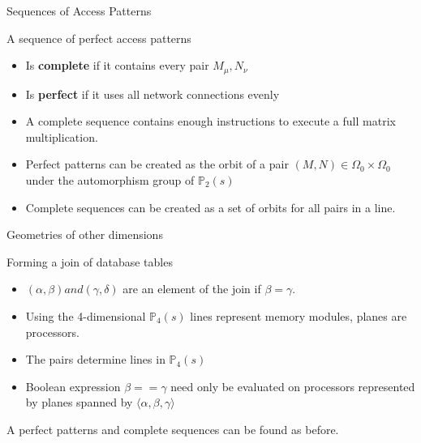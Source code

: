 \documentclass{beamer}
\begin{document}
\begin{frame}{Sequences of Access Patterns}

\begin{block}{A sequence of perfect access patterns}
\begin{itemize}
\item Is {\bf complete} if it contains every pair $M_\mu, N_\nu$
\item Is {\bf perfect} if it uses all network connections evenly
\end{itemize}
\end{block}

\begin{itemize}
\item A complete sequence contains enough instructions to execute a full matrix multiplication.
\item Perfect patterns can be created as the orbit of a pair $(M,N) \in \Omega_0 \times \Omega_0$ under the automorphism group of $\mathbb{P}_2(s)$
\item Complete sequences can be created as a set of orbits for all pairs in a line.
\end{itemize}

\end{frame}

\begin{frame}{Geometries of other dimensions}

\begin{block}{Forming a join of database tables}
\begin{itemize}
\item $(\alpha, \beta) and (\gamma, \delta)$ are an element of the join if $\beta = \gamma$.
\item Using the 4-dimensional $\mathbb{P}_4(s)$ lines represent memory modules, planes are processors.
\item The pairs determine lines in $\mathbb{P}_4(s)$
\item Boolean expression $\beta == \gamma$ need only be evaluated on processors represented by planes spanned by $\langle \alpha, \beta, \gamma \rangle$
\end{itemize}
\end{block}
A perfect patterns and complete sequences can be found as before.
\end{frame}
\end{document}
